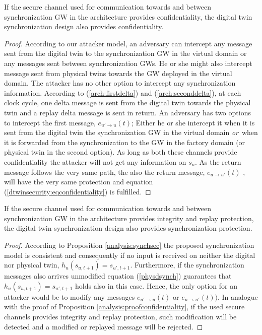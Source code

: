 \begin{prop}
\label{analysis:proofconfidentiality}
If the secure channel used for communication towards and between synchronization GW in the architecture provides confidentiality, the digital twin synchronization design also provides confidentiality.
\end{prop}
\begin{proof}
According to our attacker model, an adversary can intercept any message sent from the digital twin to the synchronization GW in the virtual domain or any messages sent between synchronization GWs. He or she might also intercept message sent from physical twins towards the GW deployed in the virtual domain. The attacker has no other option to intercept any synchronization information.
According to (\ref{arch:firstdelta}) and (\ref{arch:seconddelta}), at each clock cycle, one delta message is sent from the digital twin towards the physical twin and a replay delta message is sent in return. An adversary has two options to intercept the first message, $e_{u'\rightarrow u}(t)$; Either he or she intercept it when it is sent from the digital twin the synchronization GW in the virtual domain {\it or}\ when it is forwarded from the synchronization to the GW in the factory domain (or physical twin in the second option). As long as both these channels provide confidentiality the attacker will not get any information on $s_u$. As the return message follows the very same path, the also the return message, $e_{u \rightarrow u'}(t)$ , will have the very same protection and equation (\ref{dtwinsecurity:eqconfidentiality}) is fulfilled.
\end{proof}
\begin{prop}
If the secure channel used for communication towards and between synchronization GW in the architecture provides integrity and replay protection, the digital twin synchronization design also provides synchronization protection.
\end{prop}
\begin{proof}
According to Proposition \ref{analysis:synchsec} the proposed synchronization model is consistent and consequently if no input is received on neither the digital nor physical twin, $h_u(s_{u,t+1}) = s_{u',t+1}$. Furthermore, if the synchronization messages also arrives unmodified equation (\ref{physdsynch}) guarantees that $h_u(s_{u,t+1}) = s_{u',t+1}$ holds also in this case. Hence, the only option for an attacker would be to modify any messages $e_{u'\rightarrow u}(t)$ or $e_{u\rightarrow u'}(t))$. In analogue with the proof of Proposition \ref{analysis:proofconfidentiality}, if the used secure channels provides integrity and replay protection, such modification will be detected and a modified or replayed message will be rejected.  
\end{proof}
